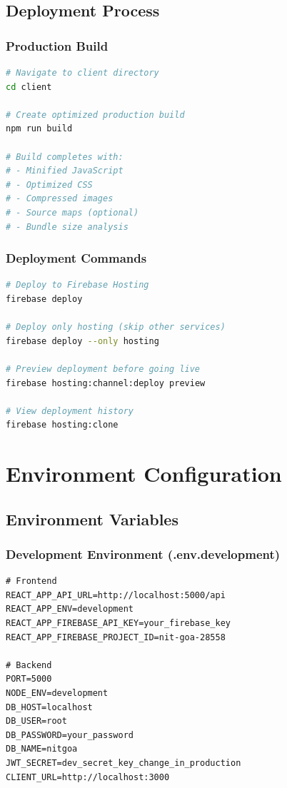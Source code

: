 \documentclass[12pt,a4paper]{report}
\begin{document}
\subsection{Deployment Process}

\subsubsection*{Production Build}
\begin{lstlisting}[language=bash, caption=Building for Production]
# Navigate to client directory
cd client

# Create optimized production build
npm run build

# Build completes with:
# - Minified JavaScript
# - Optimized CSS
# - Compressed images
# - Source maps (optional)
# - Bundle size analysis
\end{lstlisting}

\subsubsection*{Deployment Commands}
\begin{lstlisting}[language=bash, caption=Firebase Deployment]
# Deploy to Firebase Hosting
firebase deploy

# Deploy only hosting (skip other services)
firebase deploy --only hosting

# Preview deployment before going live
firebase hosting:channel:deploy preview

# View deployment history
firebase hosting:clone
\end{lstlisting}

\section{Environment Configuration}

\subsection{Environment Variables}

\subsubsection*{Development Environment (.env.development)}
\begin{lstlisting}[caption=Development Environment Variables]
# Frontend
REACT_APP_API_URL=http://localhost:5000/api
REACT_APP_ENV=development
REACT_APP_FIREBASE_API_KEY=your_firebase_key
REACT_APP_FIREBASE_PROJECT_ID=nit-goa-28558

# Backend
PORT=5000
NODE_ENV=development
DB_HOST=localhost
DB_USER=root
DB_PASSWORD=your_password
DB_NAME=nitgoa
JWT_SECRET=dev_secret_key_change_in_production
CLIENT_URL=http://localhost:3000
\end{lstlisting}
\end{document}
